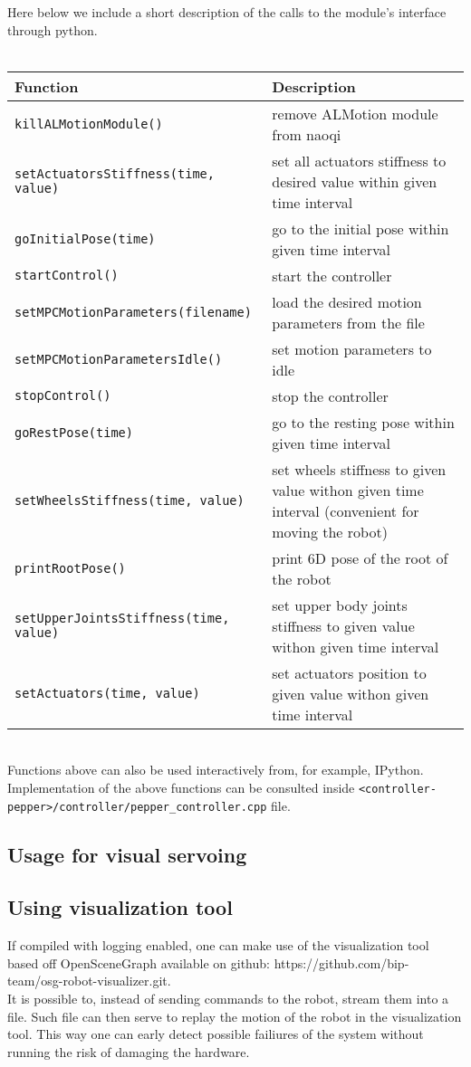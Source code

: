\noindent Here below we include a short description of the calls to the module's interface through python. \\ \\
\begin{tabular}{|l|p{5cm}|}
\hline
Function & Description \\
\hline
\texttt{killALMotionModule()} & remove ALMotion module from naoqi \\
\hline
\texttt{setActuatorsStiffness(time, value)} & set all actuators stiffness to desired
value within given time interval \\
\hline
\texttt{goInitialPose(time)} & go to the initial pose within given time interval \\
\hline
\texttt{startControl()} & start the controller \\
\hline
\texttt{setMPCMotionParameters(filename)} & load the desired motion parameters from the file \\
\hline
\texttt{setMPCMotionParametersIdle()} & set motion parameters to idle \\
\hline
\texttt{stopControl()} & stop the controller \\
\hline
\texttt{goRestPose(time)} & go to the resting pose within given time interval \\
\hline
\texttt{setWheelsStiffness(time, value)} & set wheels stiffness to given value withon given time interval (convenient for moving the
robot) \\
\hline
\texttt{printRootPose()} & print 6D pose of the root of the robot \\
\hline
\texttt{setUpperJointsStiffness(time, value)} & set upper body joints stiffness to given value withon given time interval \\
\hline
\texttt{setActuators(time, value)} & set actuators position to given value withon given time interval \\
\hline
\end{tabular} \\

\noindent Functions above can also be used interactively from, for example, IPython. Implementation of the above
functions can be consulted inside \texttt{<controller-pepper>/controller/pepper\_controller.cpp} file.

\subsection{Usage for visual servoing}

\subsection{Using visualization tool}
\noindent If compiled with logging enabled, one can make use of the visualization tool based off OpenSceneGraph
available on github: https://github.com/bip-team/osg-robot-visualizer.git. \\
\noindent It is possible to, instead of sending commands to the robot, stream them into a file. Such file can then serve
to replay the motion of the robot in the visualization tool. This way one can early detect possible failiures of the
system without running the risk of damaging the hardware.

